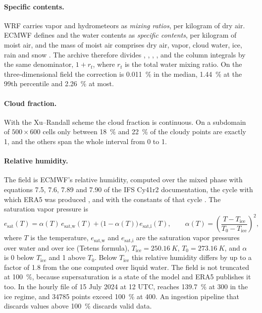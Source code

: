 \paragraph{Specific contents.} WRF carries vapor and hydrometeors as \emph{mixing ratios}, per
kilogram of dry air. ECMWF defines  and the water contents as \emph{specific contents},
per kilogram of moist air, and the mass of moist air comprises dry air, vapor, cloud water, ice,
rain and snow \parencite{paramdb}. The archive therefore divides , ,
, ,  and the column integrals by the same denominator,
$1 + r_t$, where $r_t$ is the total water mixing ratio. On the three-dimensional field the
correction is \SI{0.011}{\percent} in the median, \SI{1.44}{\percent} at the 99th percentile and
\SI{2.26}{\percent} at most.

\paragraph{Cloud fraction.} With the Xu--Randall scheme the cloud fraction  is
continuous. On a subdomain of $500 \times 600$ cells only between \SI{18}{\percent} and
\SI{22}{\percent} of the cloudy points are exactly 1, and the others span the whole interval from
0 to 1.

\paragraph{Relative humidity.} The field  is ECMWF's relative humidity, computed over the
mixed phase with equations 7.5, 7.6, 7.89 and 7.90 of the IFS Cy41r2 documentation, the cycle
with which ERA5 was produced \parencite{era5doc}, and with the constants of that cycle
\parencite{ifs41r2p4}. The saturation vapor pressure is
\begin{equation}
  e_\text{sat}(T) = \alpha(T)\, e_\text{sat,w}(T) + \bigl(1 - \alpha(T)\bigr)\, e_\text{sat,i}(T),
  \qquad
  \alpha(T) = \left(\frac{T - T_\text{ice}}{T_0 - T_\text{ice}}\right)^{2},
  \label{eq:fase-mista}
\end{equation}
where $T$ is the temperature, $e_\text{sat,w}$ and $e_\text{sat,i}$ are the saturation vapor
pressures over water and over ice (Tetens formula), $T_\text{ice} = \SI{250.16}{K}$,
$T_0 = \SI{273.16}{K}$, and $\alpha$ is 0 below $T_\text{ice}$ and 1 above $T_0$. Below
$T_\text{ice}$ this relative humidity differs by up to a factor of \num{1.8} from the one computed
over liquid water. The field is not truncated at \SI{100}{\percent}, because supersaturation is a
state of the model and ERA5 publishes it too. In the hourly file of 15 July 2024 at 12 UTC,
 reaches \SI{139.7}{\percent} at \SI{300}{\hPa} in the ice regime, and \num{34785} points
exceed \SI{100}{\percent} at \SI{400}{\hPa}. An ingestion pipeline that discards values above
\SI{100}{\percent} discards valid data.


